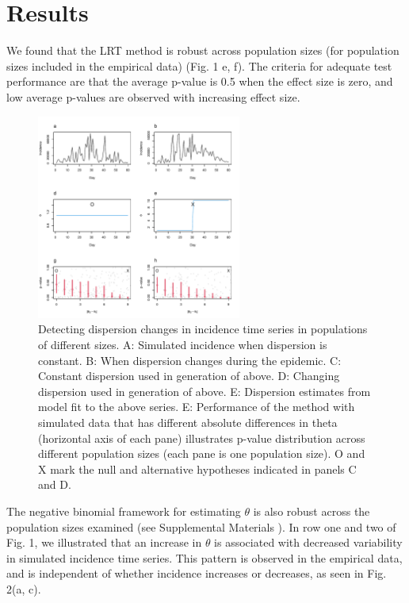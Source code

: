 \documentclass[10pt,letterpaper]{article}
\begin{document}
\section*{Results}
We found that the LRT method is robust across population sizes (for population sizes included in the empirical data) (Fig. 1 e, f).
The criteria for adequate test performance are that the average p-value is 0.5 when the effect size is zero, and low average p-values are observed with increasing effect size. 
\begin{figure}[!h]
\includegraphics[width=0.6\textwidth]{fig1}
\caption{
Detecting dispersion changes in incidence time series in populations of different sizes. A: Simulated incidence when dispersion is constant. B: When dispersion changes during the epidemic. C: Constant dispersion used in generation of above. D: Changing dispersion used in generation of above. E: Dispersion estimates from model fit to the above series. E: Performance of the method with simulated data that has different absolute differences in theta (horizontal axis of each pane) illustrates p-value distribution across different population sizes (each pane is one population size). O and X mark the null and alternative hypotheses indicated in panels C and D. 
 }
\label{fig1}
\end{figure}
The negative binomial framework for estimating \begin{math}\theta\end{math} is also robust across the population sizes examined (see Supplemental Materials ).
In row one and two of Fig. 1, we illustrated that an increase in \begin{math}\theta\end{math} is associated with decreased variability in simulated incidence time series. This pattern is observed in the empirical data, and is independent of whether incidence increases or decreases, as seen in Fig. 2(a, c).
\end{document}
